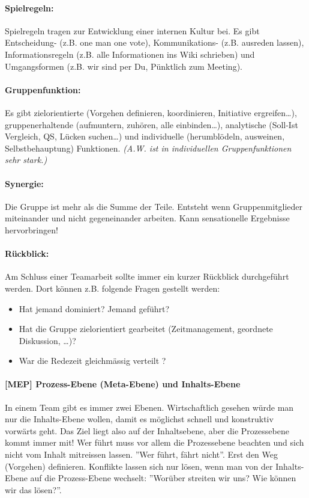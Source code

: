 \paragraph{Spielregeln:} Spielregeln tragen zur Entwicklung einer internen Kultur bei. Es gibt Entscheidung- (z.B. one man one vote), Kommunikations- (z.B. ausreden lassen), Informationsregeln (z.B. alle Informationen ins Wiki schrieben) und Umgangsformen (z.B. wir sind per Du, Pünktlich zum Meeting).

\paragraph{Gruppenfunktion:} Es gibt zielorientierte (Vorgehen definieren, koordinieren, Initiative ergreifen\dots), gruppenerhaltende (aufmuntern, zuhören, alle einbinden\dots), analytische (Soll-Ist Vergleich, QS, Lücken suchen\dots) und individuelle (herumblödeln, ausweinen, Selbstbehauptung) Funktionen. \textit{(A.W. ist in individuellen Gruppenfunktionen sehr stark.)}

\paragraph{Synergie:} Die Gruppe ist mehr als die Summe der Teile. Entsteht wenn Gruppenmitglieder miteinander und nicht gegeneinander arbeiten. Kann sensationelle Ergebnisse hervorbringen!

\paragraph{Rückblick:} Am Schluss einer Teamarbeit sollte immer ein kurzer Rückblick durchgeführt werden. Dort können z.B. folgende Fragen gestellt werden:
\begin{itemize}
	\item Hat jemand dominiert? Jemand geführt?
	\item Hat die Gruppe zielorientiert gearbeitet (Zeitmanagement, geordnete Diskussion, \dots)?
	\item War die Redezeit gleichmässig verteilt ?
\end{itemize}

\paragraph{[MEP] Prozess-Ebene (Meta-Ebene) und Inhalts-Ebene} In einem Team gibt es immer zwei Ebenen. Wirtschaftlich gesehen würde man nur die Inhalts-Ebene wollen, damit es möglichst schnell und konstruktiv vorwärts geht. Das Ziel liegt also auf der Inhaltsebene, aber die Prozessebene kommt immer mit! Wer führt muss vor allem die Prozessebene beachten und sich nicht vom Inhalt mitreissen lassen. ''Wer führt, fährt nicht''. Erst den Weg (Vorgehen) definieren. Konflikte lassen sich nur lösen, wenn man von der Inhalts-Ebene auf die Prozess-Ebene wechselt: ''Worüber streiten wir uns? Wie können wir das lösen?''.

